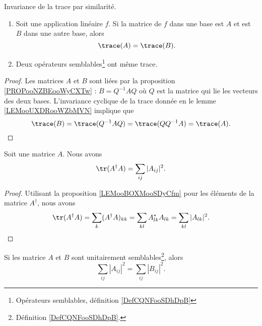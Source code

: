 \begin{proposition}      \label{PROPooRMYQooWkEpJJ}
	Invariance de la trace par similarité.
	\begin{enumerate}
		\item
		      Soit une application linéaire \( f\). Si la matrice de \( f\) dans une base est \( A\) et est \( B\) dans une autre base, alors
		      \begin{equation}
			      \trace(A)=\trace(B).
		      \end{equation}
		\item
		      Deux opérateurs semblables\footnote{Opérateurs semblables, définition \ref{DefCQNFooSDhDpB}} ont même trace.
	\end{enumerate}
\end{proposition}

\begin{proof}
	Les matrices \( A\) et \( B\) sont liées par la proposition \ref{PROPooNZBEooWyCXTw} : \( B=Q^{-1}AQ\) où \( Q\) est la matrice qui lie les vecteurs des deux bases. L'invariance cyclique de la trace donnée en le lemme \ref{LEMooUXDRooWZbMVN} implique que
	\begin{equation}
		\trace(B)=\trace(Q^{-1}AQ)=\trace(QQ^{-1}A)=\trace(A).
	\end{equation}
\end{proof}

\begin{lemma}       \label{LEMooXXEYooKHyQjb}
	Soit une matrice \( A\). Nous avons
	\begin{equation}
		\tr(A^{\dag} A)=\sum_{ij}| A_{ij} |^2.
	\end{equation}
\end{lemma}

\begin{proof}
	Utilisant la proposition \ref{LEMooBOXMooSDyCfm} pour les éléments de la matrice \( A^{\dag}\), nous avons
	\begin{equation}
		\tr(A^{\dag}A)=\sum_k(A^{\dag}A)_{kk}
		=\sum_{kl}A^*_{lk}A_{lk}
		=\sum_{kl}| A_{lk} |^2.
	\end{equation}
\end{proof}

\begin{lemma}     \label{LEMooQXFQooLGPcIt}
	Si les matrice \( A\) et \( B\) sont unitairement semblables\footnote{Définition \ref{DefCQNFooSDhDpB}.}, alors
	\begin{equation}
		\sum_{ij}| A_{ij} |^2=\sum_{ij}| B_{ij} |^2.
	\end{equation}
\end{lemma}

